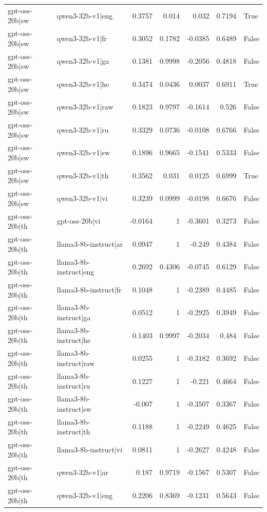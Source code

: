 \begin{table}
\begin{tabular}{l l r r r r l}
gpt-oss-20b|sw & qwen3-32b-v1|eng & 0.3757 & 0.014 & 0.032 & 0.7194 & True \\
gpt-oss-20b|sw & qwen3-32b-v1|fr & 0.3052 & 0.1782 & -0.0385 & 0.6489 & False \\
gpt-oss-20b|sw & qwen3-32b-v1|ga & 0.1381 & 0.9998 & -0.2056 & 0.4818 & False \\
gpt-oss-20b|sw & qwen3-32b-v1|he & 0.3474 & 0.0436 & 0.0037 & 0.6911 & True \\
gpt-oss-20b|sw & qwen3-32b-v1|raw & 0.1823 & 0.9797 & -0.1614 & 0.526 & False \\
gpt-oss-20b|sw & qwen3-32b-v1|ru & 0.3329 & 0.0736 & -0.0108 & 0.6766 & False \\
gpt-oss-20b|sw & qwen3-32b-v1|sw & 0.1896 & 0.9665 & -0.1541 & 0.5333 & False \\
gpt-oss-20b|sw & qwen3-32b-v1|th & 0.3562 & 0.031 & 0.0125 & 0.6999 & True \\
gpt-oss-20b|sw & qwen3-32b-v1|vi & 0.3239 & 0.0999 & -0.0198 & 0.6676 & False \\
gpt-oss-20b|th & gpt-oss-20b|vi & -0.0164 & 1 & -0.3601 & 0.3273 & False \\
gpt-oss-20b|th & llama3-8b-instruct|ar & 0.0947 & 1 & -0.249 & 0.4384 & False \\
gpt-oss-20b|th & llama3-8b-instruct|eng & 0.2692 & 0.4306 & -0.0745 & 0.6129 & False \\
gpt-oss-20b|th & llama3-8b-instruct|fr & 0.1048 & 1 & -0.2389 & 0.4485 & False \\
gpt-oss-20b|th & llama3-8b-instruct|ga & 0.0512 & 1 & -0.2925 & 0.3949 & False \\
gpt-oss-20b|th & llama3-8b-instruct|he & 0.1403 & 0.9997 & -0.2034 & 0.484 & False \\
gpt-oss-20b|th & llama3-8b-instruct|raw & 0.0255 & 1 & -0.3182 & 0.3692 & False \\
gpt-oss-20b|th & llama3-8b-instruct|ru & 0.1227 & 1 & -0.221 & 0.4664 & False \\
gpt-oss-20b|th & llama3-8b-instruct|sw & -0.007 & 1 & -0.3507 & 0.3367 & False \\
gpt-oss-20b|th & llama3-8b-instruct|th & 0.1188 & 1 & -0.2249 & 0.4625 & False \\
gpt-oss-20b|th & llama3-8b-instruct|vi & 0.0811 & 1 & -0.2627 & 0.4248 & False \\
gpt-oss-20b|th & qwen3-32b-v1|ar & 0.187 & 0.9719 & -0.1567 & 0.5307 & False \\
gpt-oss-20b|th & qwen3-32b-v1|eng & 0.2206 & 0.8369 & -0.1231 & 0.5643 & False \\

\end{tabular}
\end{table}
